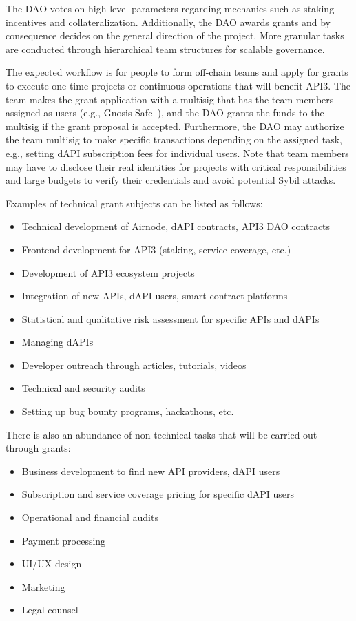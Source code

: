 \documentclass[11pt]{article}
\begin{document}
The DAO votes on high-level parameters regarding mechanics such as staking incentives and collateralization.
Additionally, the DAO awards grants and by consequence decides on the general direction of the project.
More granular tasks are conducted through hierarchical team structures for scalable governance.

The expected workflow is for people to form off-chain teams and apply for grants to execute one-time projects or continuous operations that will benefit API3.
The team makes the grant application with a multisig that has the team members assigned as users (e.g., Gnosis Safe~\cite{gnosis}), and the DAO grants the funds to the multisig if the grant proposal is accepted.
Furthermore, the DAO may authorize the team multisig to make specific transactions depending on the assigned task, e.g., setting dAPI subscription fees for individual users.
Note that team members may have to disclose their real identities for projects with critical responsibilities and large budgets to verify their credentials and avoid potential Sybil attacks.

Examples of technical grant subjects can be listed as follows:
\begin{itemize}
    \item Technical development of Airnode, dAPI contracts, API3 DAO contracts
    \item Frontend development for API3 (staking, service coverage, etc.)
    \item Development of API3 ecosystem projects
    \item Integration of new APIs, dAPI users, smart contract platforms
    \item Statistical and qualitative risk assessment for specific APIs and dAPIs
    \item Managing dAPIs
    \item Developer outreach through articles, tutorials, videos
    \item Technical and security audits
    \item Setting up bug bounty programs, hackathons, etc.
\end{itemize}

There is also an abundance of non-technical tasks that will be carried out through grants:
\begin{itemize}
    \item Business development to find new API providers, dAPI users
    \item Subscription and service coverage pricing for specific dAPI users
    \item Operational and financial audits
    \item Payment processing
    \item UI/UX design
    \item Marketing
    \item Legal counsel
\end{itemize}
\end{document}
